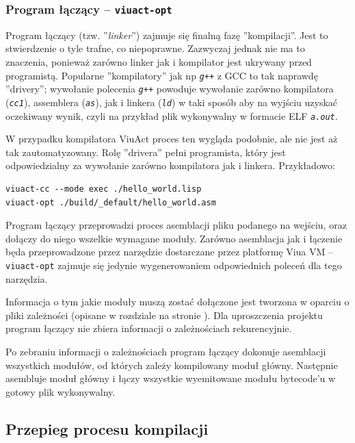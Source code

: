 \documentclass[11pt,oneside,a4paper,titlepage,onecolumn]{article}
\begin{document}
\subsubsection{Program łączący -- \texttt{viuact-opt}}
\label{opis_linkera}

Program łączący (tzw. ''\emph{linker}'') zajmuje się finalną fazę ''kompilacji''.
Jest to stwierdzenie o tyle trafne, co niepoprawne. Zazwyczaj jednak nie ma to znaczenia, ponieważ zarówno
linker jak i kompilator jest ukrywany przed programistą. Popularne ''kompilatory'' jak np \emph{\texttt{g++}}
z GCC to tak naprawdę ''drivery''; wywołanie polecenia \emph{\texttt{g++}} powoduje wywołanie zarówno
kompilatora (\emph{\texttt{cc1}}), assemblera (\emph{\texttt{as}}), jak i linkera (\emph{\texttt{ld}}) w taki
sposób aby na wyjściu uzyskać oczekiwany wynik, czyli na przykład plik wykonywalny w formacie
ELF \emph{\texttt{a.out}}.

W przypadku kompilatora ViuAct proces ten wygląda podobnie, ale nie jest aż tak zautomatyzowany.
Rolę ''drivera'' pełni programista, który jest odpowiedzialny za wywołanie zarówno kompilatora jak i linkera.
Przykładowo:

\begin{lstlisting}
viuact-cc --mode exec ./hello_world.lisp
viuact-opt ./build/_default/hello_world.asm
\end{lstlisting}

Program łączący przeprowadzi proces asemblacji pliku podanego na wejściu, oraz dołączy do niego wszelkie
wymagane moduły. Zarówno asemblacja jak i łączenie będa przeprowadzone przez narzędzie dostarczane przez
platformę Viua VM -- \texttt{viuact-opt} zajmuje się jedynie wygenerowaniem odpowiednich poleceń dla tego
narzędzia.

Informacja o tym jakie moduły muszą zostać dołączone jest tworzona w oparciu o pliki zależności (opisane w
rozdziale  na stronie \pageref{pliki_zaleznosci_modulow}).
Dla uproszczenia projektu program łączący nie zbiera informacji o zależnościach rekurencyjnie.

Po zebraniu informacji o zależnościach program łączący dokonuje asemblacji wszystkich modułów, od których
zależy kompilowany moduł główny. Następnie asembluje moduł główny i łączy wszystkie wyemitowane modułu
bytecode'u w gotowy plik wykonywalny.

\subsection{Przepieg procesu kompilacji}
\label{opis_etapow_kompilacji}
\end{document}
